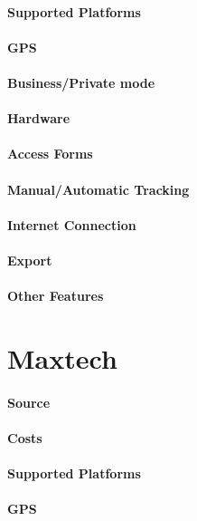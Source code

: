 \paragraph{Supported Platforms} 
\paragraph{GPS} 
\paragraph{Business/Private mode}
\paragraph{Hardware}
\paragraph{Access Forms}
\paragraph{Manual/Automatic Tracking}
\paragraph{Internet Connection}
\paragraph{Export}
\paragraph{Other Features}
\newpage
\section{Maxtech}
\paragraph{Source} 
\paragraph{Costs} 
\paragraph{Supported Platforms} 
\paragraph{GPS} 
